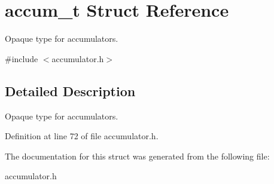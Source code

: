 \hypertarget{structaccum__t}{\section{accum\-\_\-t Struct Reference}
\label{structaccum__t}
}


Opaque type for accumulators.  




{\ttfamily \#include $<$accumulator.\-h$>$}



\subsection{Detailed Description}
Opaque type for accumulators. 

Definition at line 72 of file accumulator.\-h.



The documentation for this struct was generated from the following file\-:\begin{DoxyCompactItemize}
\item 
accumulator.\-h\end{DoxyCompactItemize}
